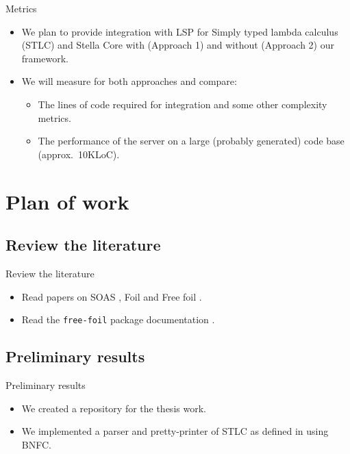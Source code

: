 \documentclass[serif, aspectratio=169]{beamer}
\begin{document}
\begin{frame}{Metrics}
    \begin{itemize}
        [<+-| alert+>] %
        \item We plan to provide integration with LSP for Simply typed lambda calculus (STLC) \cite{wiki_stlc} and Stella Core \cite{noauthor_fizrukstella_nodate} with (Approach 1) and without (Approach 2) our framework.
        \item We will measure for both approaches and compare:
              \begin{itemize}
                  \item The lines of code required for integration and some other complexity metrics.
                  \item The performance of the server on a large (probably generated) code base (approx.~10KLoC).
              \end{itemize}
    \end{itemize}
\end{frame}

\section{Plan of work}

\subsection{Review the literature}

\begin{frame}{Review the literature}
    \begin{itemize}
        \item Read papers on SOAS \cite{fiore_formal_2022}, Foil \cite{maclaurin_foil_2022} and Free foil \cite{kudasov_free_2024}.
        \item Read the \texttt{free-foil} package documentation \cite{hackage_free_foil}.
    \end{itemize}
\end{frame}

\subsection{Preliminary results}

\begin{frame}{Preliminary results}
    \begin{itemize}
        \item We created a repository \cite{github_query_driven_free_foil} for the thesis work.
        \item We implemented a parser and pretty-printer of STLC as defined in \cite{dunfield_bidirectional_2020} using BNFC.
    \end{itemize}
\end{frame}
\end{document}
